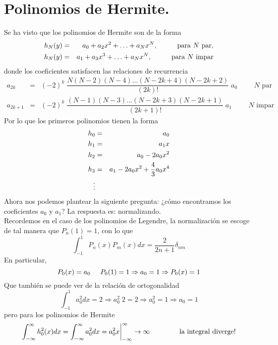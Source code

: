 \section{Polinomios de Hermite.}
Se ha visto que los polinomios de Hermite son de la forma
\begin{eqnarray*}
h_{N} (y) &=& a_{0} + a_{2} x^{2} + \ldots + a_{N} x^{N}, \hspace{1cm} \text{para } N \text{ par}, \nonumber \\
h_{N} (y) &=& a_{1} + a_{3} x^{3} + \ldots + a_{N} x^{N}, \hspace{1cm} \text{para } N \text{ impar}
\end{eqnarray*}
donde los coeficientes satisfacen las relaciones de recurrencia
\begingroup\makeatletter\def\f@size{12}\check@mathfonts
\begin{eqnarray}
a_{2k} &=& (-2)^{k} \; \dfrac{N (N - 2)(N - 4) \ldots (N - 2k + 4)(N - 2k + 2)}{(2k)!} \; a_{0} \hspace{1cm} N \text{ par} \label{eq:ecuacion_06_28} \\
a_{2k+1} &=& (-2)^{k} \; \dfrac{(N - 1)(N - 3) \ldots (N - 2k + 3)(N - 2k + 1)}{(2k + 1)!} \; a_{1} \hspace{1cm} N \text{ impar} \label{eq:ecuacion_06_29}
\end{eqnarray}
\endgroup
Por lo que los primeros polinomios tienen la forma
\begin{eqnarray*}
h_{0} &=& a_{0} \nonumber \\
h_{1} &=& a_{1} x \nonumber \\
h_{2} &=& a_{0} - 2 a_{0} x^{2} \nonumber \\
h_{3} &=& a_{1} - 2 a_{0} x^{2} + \dfrac{4}{3} a_{0} x^{4} \nonumber \\
\vdots \nonumber
\end{eqnarray*}
Ahora nos podemos plantear la siguiente pregunta: ¿cómo encontramos los coeficientes $a_{0}$ y $a_{1}$? La respuesta es: normalizando.
\\
Recordemos en el caso de los polinomios de Legendre, la normalización se escoge de tal manera que $P_{n}(1)=1$, con lo que
\[ \int_{-1}^{1} P_{n}(x) P_{m}(x) dx = \dfrac{2}{2n + 1} \delta_{nm} \]
En particular,
\[  P_{0}(x) = a_{0} \hspace{0.5cm} P_{0}(1) = 1 \Rightarrow a_{0} = 1 \Rightarrow P_{0} (x) = 1 \]
Que también se puede ver de la relación de ortogonalidad
\[ \int_{-1}^{1} a_{0}^{2} dx = 2 \Rightarrow a_{0}^{2} \; 2 = 2 \Rightarrow a_{0}^{2} = 1 \Rightarrow a_{0} = 1 \]
pero para los polinomios de Hermite
\[ \int_{- \infty}^{\infty} h_{0}^{2} (x) dx = \int_{- \infty}^{\infty} a_{0}^{2} dx = a_{0}^{2} x \bigg\vert_{-\infty}^{\infty} \rightarrow \infty \hspace{1.5cm} \text{la integral diverge!} \]
